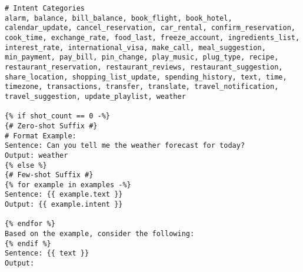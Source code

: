 \begin{verbatim}
# Intent Categories
alarm, balance, bill_balance, book_flight, book_hotel, calendar_update, cancel_reservation, car_rental, confirm_reservation, cook_time, exchange_rate, food_last, freeze_account, ingredients_list, interest_rate, international_visa, make_call, meal_suggestion, min_payment, pay_bill, pin_change, play_music, plug_type, recipe, restaurant_reservation, restaurant_reviews, restaurant_suggestion, share_location, shopping_list_update, spending_history, text, time, timezone, transactions, transfer, translate, travel_notification, travel_suggestion, update_playlist, weather

{% if shot_count == 0 -%}
{# Zero-shot Suffix #}
# Format Example:
Sentence: Can you tell me the weather forecast for today?
Output: weather
{% else %}
{# Few-shot Suffix #}
{% for example in examples -%}
Sentence: {{ example.text }}
Output: {{ example.intent }}

{% endfor %}
Based on the example, consider the following:
{% endif %}
Sentence: {{ text }}
Output: 
\end{verbatim}


